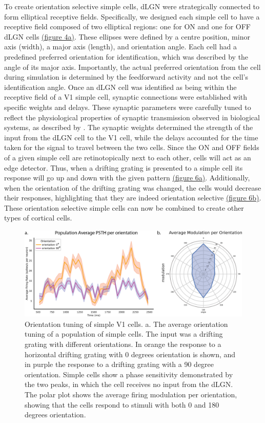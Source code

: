 \documentclass[12pt]{article}
\begin{document}
To create orientation selective simple cells, dLGN were strategically connected to form elliptical receptive fields. Specifically, we designed each simple cell to have a receptive field composed of two elliptical regions: one for ON and one for OFF dLGN cells \hyperref[fig:LIF_connectivity]{(figure 4a)}. These ellipses were defined by a centre position, minor axis (width), a major axis (length), and orientation angle. Each cell had a predefined preferred orientation for identification, which was described by the angle of its major axis. Importantly, the actual preferred orientation from the cell during simulation is determined by the feedforward activity and not the cell's identification angle. Once an dLGN cell was identified as being within the receptive field of a V1 simple cell, synaptic connections were established with specific weights and delays. These synaptic parameters were carefully tuned to reflect the physiological properties of synaptic transmission observed in biological systems, as described by \textcite{durandComparisonVisualResponse2016}. The synaptic weights determined the strength of the input from the dLGN cell to the V1 cell, while the delays accounted for the time taken for the signal to travel between the two cells. Since the ON and OFF fields of a given simple cell are retinotopically next to each other, cells will act as an edge detector. Thus, when a drifting grating is presented to a simple cell its response will go up and down with the given pattern \hyperref[fig:simple cell orientation tuning]{(figure 6a)}. Additionally, when the orientation of the drifting grating was changed, the cells would decrease their responses, highlighting that they are indeed orientation selective \hyperref[fig:simple cell orientation tuning]{(figure 6b)}. These orientation selective simple cells can now be combined to create other types of cortical cells.

\begin{figure}[H]
    \centering
    \includegraphics[width=1.0 \textwidth]{figures/figure_simple_orientation_tuning.png}
    \caption{Orientation tuning of simple V1 cells. a. The average orientation tuning of a population of simple cells. The input was a drifting grating with different orientations. In orange the response to a horizontal drifting grating with 0 degrees orientation is shown, and in purple the response to a drifting grating with a 90 degree orientation. Simple cells show a phase sensitivity demonstrated by the two peaks, in which the cell receives no input from the dLGN. The polar plot shows the average firing modulation per orientation, showing that the cells respond to stimuli with both 0 and 180 degrees orientation.}
    \label{fig:simple cell orientation tuning}
\end{figure}
\end{document}
